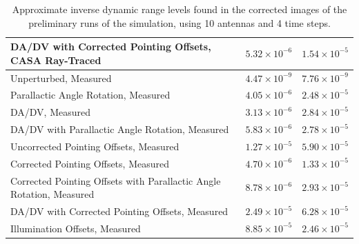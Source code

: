 \documentclass[11pt]{article}
\begin{document}
\begin{table}
\begin{tabular}{|p{8cm}|c|c|}
    \hline
    DA/DV with Corrected Pointing Offsets, CASA Ray-Traced & $5.32 \times
    10^{-6}$ & $1.54 \times 10^{-5}$ \\
    \hline
    Unperturbed, Measured & $4.47 \times 10^{-9}$ & $7.76 \times
    10^{-9}$ \\
    \hline
    Parallactic Angle Rotation, Measured & $4.05 \times 10^{-6}$ &
    $2.48 \times 10^{-5}$\\
    \hline
    DA/DV, Measured & $3.13 \times 10^{-6}$ & $2.84 \times 10^{-5}$ \\
    \hline
    DA/DV with Parallactic Angle Rotation, Measured & $5.83 \times
    10^{-6}$ & $2.78 \times 10^{-5}$ \\
    \hline
    Uncorrected Pointing Offsets, Measured & $1.27 \times 10^{-5}$
    & $5.90 \times 10^{-5}$ \\
    \hline
    Corrected Pointing Offsets, Measured & $4.70 \times 10^{-6}$ &
    $1.33 \times 10^{-5}$\\
    \hline
    Corrected Pointing Offsets with Parallactic Angle Rotation, Measured & 
    $8.78 \times 10^{-6}$ & $2.93 \times 10^{-5}$ \\
    \hline
    DA/DV with Corrected Pointing Offsets, Measured & $2.49 \times
    10^{-5}$ & $6.28 \times 10^{-5}$ \\
    \hline
    Illumination Offsets, Measured & $8.85 \times
    10^{-5}$ & $2.46 \times 10^{-5}$ \\
    \hline
    \end{tabular}
    \caption{
        Approximate inverse dynamic range levels found in the corrected images 
        of the preliminary runs of the simulation, using 10 antennas and 4 time 
        steps.
    }
    \label{tab:rms-10ants}
\end{table}
\end{document}
